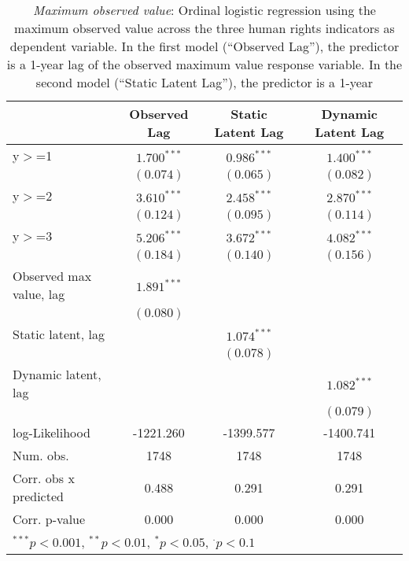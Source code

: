 
\begin{table}[h]
\begin{center}
\begin{tabular}{l c c c }
\hline
 & Observed Lag & Static Latent Lag & Dynamic Latent Lag \\
\hline
y$>$=1                  & $1.700^{***}$ & $0.986^{***}$ & $1.400^{***}$ \\
                        & $(0.074)$     & $(0.065)$     & $(0.082)$     \\
y$>$=2                  & $3.610^{***}$ & $2.458^{***}$ & $2.870^{***}$ \\
                        & $(0.124)$     & $(0.095)$     & $(0.114)$     \\
y$>$=3                  & $5.206^{***}$ & $3.672^{***}$ & $4.082^{***}$ \\
                        & $(0.184)$     & $(0.140)$     & $(0.156)$     \\
Observed max value, lag & $1.891^{***}$ &               &               \\
                        & $(0.080)$     &               &               \\
Static  latent, lag     &               & $1.074^{***}$ &               \\
                        &               & $(0.078)$     &               \\
Dynamic latent, lag     &               &               & $1.082^{***}$ \\
                        &               &               & $(0.079)$     \\
\hline
log-Likelihood          & -1221.260     & -1399.577     & -1400.741     \\
Num. obs.               & 1748          & 1748          & 1748          \\
Corr. obs x predicted   & 0.488         & 0.291         & 0.291         \\
Corr. p-value           & 0.000         & 0.000         & 0.000         \\
\hline
\multicolumn{4}{l}{\scriptsize{$^{***}p<0.001$, $^{**}p<0.01$, $^*p<0.05$, $^{\cdot}p<0.1$}}
\end{tabular}
\caption{\emph{Maximum observed value}: Ordinal logistic regression using the maximum observed
       value across the three human rights 
       indicators as dependent variable. In the first model (``Observed Lag''), the predictor is a 1-year lag
       of the observed maximum value response variable. In the second model (``Static Latent Lag''), the predictor is a 1-year
}
\end{center}
\end{table}
